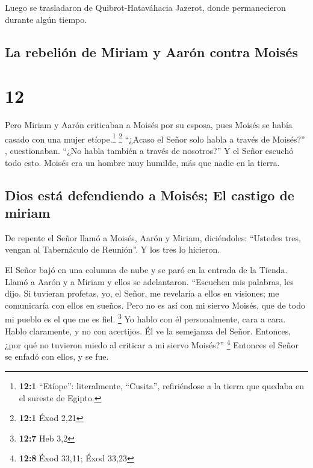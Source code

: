 Luego se trasladaron de Quibrot-Hataváhacia Jazerot,
donde permanecieron durante algún tiempo.

\hypertarget{la-rebeliuxf3n-de-miriam-y-aaruxf3n-contra-moisuxe9s}{%
\subsection{La rebelión de Miriam y Aarón contra
Moisés}\label{la-rebeliuxf3n-de-miriam-y-aaruxf3n-contra-moisuxe9s}}

\hypertarget{section-11}{%
\section{12}\label{section-11}}

 Pero Miriam y Aarón criticaban a Moisés por su esposa,
pues Moisés se había casado con una mujer etíope.\footnote{\textbf{12:1}
  ``Etíope'': literalmente, ``Cusita'', refiriéndose a la tierra que
  quedaba en el sureste de Egipto.} \footnote{\textbf{12:1} Éxod 2,21}
 ``¿Acaso el Señor solo habla a través de Moisés?'' ,
cuestionaban. ``¿No habla también a través de nosotros?'' Y el Señor
escuchó todo esto.  Moisés era un hombre muy humilde, más
que nadie en la tierra.

\hypertarget{dios-estuxe1-defendiendo-a-moisuxe9s-el-castigo-de-miriam}{%
\subsection{Dios está defendiendo a Moisés; El castigo de
miriam}\label{dios-estuxe1-defendiendo-a-moisuxe9s-el-castigo-de-miriam}}

 De repente el Señor llamó a Moisés, Aarón y Miriam,
diciéndoles: ``Ustedes tres, vengan al Tabernáculo de Reunión''. Y los
tres lo hicieron.

 El Señor bajó en una columna de nube y se paró en la
entrada de la Tienda. Llamó a Aarón y a Miriam y ellos se adelantaron.
 ``Escuchen mis palabras, les dijo. Si tuvieran profetas,
yo, el Señor, me revelaría a ellos en visiones; me comunicaría con ellos
en sueños.  Pero no es así con mi siervo Moisés, que de
todo mi pueblo es el que me es fiel. \footnote{\textbf{12:7} Heb 3,2}
 Yo hablo con él personalmente, cara a cara. Hablo
claramente, y no con acertijos. Él ve la semejanza del Señor. Entonces,
¿por qué no tuvieron miedo al criticar a mi siervo Moisés?'' \footnote{\textbf{12:8}
  Éxod 33,11; Éxod 33,23}  Entonces el Señor se enfadó con
ellos, y se fue.

